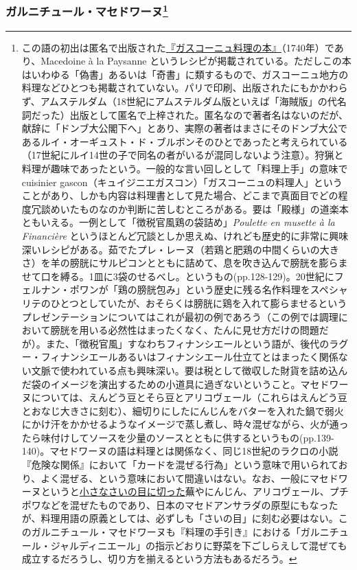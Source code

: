 \begin{recette}
{\subsubsection[ガルニチュール・マセドワーヌ]{\texorpdfstring{ガルニチュール・マセドワーヌ\footnote{この語の初出は匿名で出版された\href{http://gallica.bnf.fr/ark:/12148/bpt6k1511832p}{『ガスコーニュ料理の本』}（1740年）であり、Macedoine
  à la Paysanne
  というレシピが掲載されている。ただしこの本はいわゆる「偽書」あるいは「奇書」に類するもので、ガスコーニュ地方の料理などひとつも掲載されていない。パリで印刷、出版されたにもかかわらず、アムステルダム（18世紀にアムステルダム版といえば「海賊版」の代名詞だった）出版として匿名で上梓された。匿名なので著者名はないのだが、献辞に「ドンブ大公閣下へ」とあり、実際の著者はまさにそのドンブ大公であるルイ・オーギュスト・ド・ブルボンそのひとであったと考えられている（17世紀にルイ14世の子で同名の者がいるが混同しないよう注意）。狩猟と料理が趣味であったという。一般的な言い回しとして「料理上手」の意味でcuisinier
  gascon（キュイジニエガスコン）「ガスコーニュの料理人」ということがあり、しかも内容は料理書として見た場合、どこまで真面目でどの程度冗談めいたものなのか判断に苦しむところがある。要は「殿様」の道楽本ともいえる。一例として「徴税官風鶏の袋詰め」\emph{Poulette
  en musette à la Financière}
  というほとんど冗談としか思えぬ、けれども歴史的に非常に興味深いレシピがある。茹でたプレ・レーヌ（若鶏と肥鶏の中間くらいの大きさ）を羊の膀胱にサルピコンとともに詰めて、息を吹き込んで膀胱を膨らませて口を縛る。1皿に3袋のせるべし。というもの(pp.128-129)。20世紀にフェルナン・ポワンが「鶏の膀胱包み」という歴史に残る名作料理をスペシャリテのひとつとしていたが、おそらくは膀胱に鶏を入れて膨らませるというプレゼンテーションについてはこれが最初の例であろう（この例では調理において膀胱を用いる必然性はまったくなく、たんに見せ方だけの問題だが）。また、「徴税官風」すなわちフィナンシエールという語が、後代のラグー・フィナンシエールあるいはフィナンシエール仕立てとはまったく関係ない文脈で使われている点も興味深い。要は税として徴収した財貨を詰め込んだ袋のイメージを演出するための小道具に過ぎないということ。マセドワーヌについては、えんどう豆とそら豆とアリコヴェール（これらはえんどう豆とおなじ大きさに刻む）、細切りにしたにんじんをバターを入れた鍋で弱火にかけ汗をかかせるようなイメージで蒸し煮し、時々混ぜながら、火が通ったら味付けしてソースを少量のソースとともに供するというもの(pp.139-140)。マセドワーヌの語は料理とは関係なく、同じ18世紀のラクロの小説『危険な関係』において「カードを混ぜる行為」という意味で用いられており、よく混ぜる、という意味において間違いはない。なお、一般にマセドワーヌというと\ul{小さなさいの目に切った}蕪やにんじん、アリコヴェール、プチポワなどを混ぜたものであり、日本のマセドアンサラダの原型にもなったが、料理用語の原義としては、必ずしも「さいの目」に刻む必要はない。このガルニチュール・マセドワーヌも『料理の手引き』における「ガルニチュール・ジャルディニエール」の指示どおりに野菜を下ごしらえして混ぜても成立するだろうし、切り方を揃えるという方法もあるだろう。}}{ガルニチュール・マセドワーヌ}}\label{garniture-macedoine}}


\end{recette}
